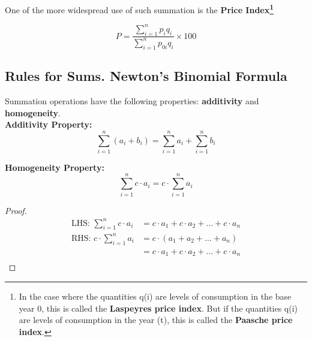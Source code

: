 \documentclass{article}
\begin{document}
One of the more widespread use of such summation is the \textbf{Price Index\footnote{In the case where the quantities q(i) are levels of consumption in the base year 0, this is called the\textbf{ Laspeyres price index}. But if the quantities q(i) are levels of consumption in the year (t), this is called the \textbf{Paasche price index}.
}}

\begin{equation}
    P = \frac{\sum_{i=1}^{n} p_i q_i}{\sum_{i=1}^{n} p_{0i} q_i} \times 100
\end{equation}



\subsection{Rules for Sums. Newton’s Binomial Formula}

Summation operations have the following properties: \textbf{additivity} and \textbf{homogeneity}.\\

\textbf{Additivity Property:}
\begin{equation}
\sum_{i=1}^{n} (a_i + b_i) = \sum_{i=1}^{n} a_i + \sum_{i=1}^{n} b_i
\end{equation}

\textbf{Homogeneity Property:}
\begin{equation}
\sum_{i=1}^{n} c \cdot a_i = c \cdot \sum_{i=1}^{n} a_i
\end{equation}

\begin{proof}
\begin{align*}
\text{LHS: } \sum_{i=1}^{n} c \cdot a_i &= c \cdot a_1 + c \cdot a_2 + \ldots + c \cdot a_n \\
\text{RHS: } c \cdot \sum_{i=1}^{n} a_i &= c \cdot (a_1 + a_2 + \ldots + a_n) \\
&= c \cdot a_1 + c \cdot a_2 + \ldots + c \cdot a_n \\
\end{align*}
\end{proof}
\end{document}
